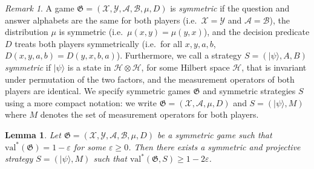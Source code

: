 \documentclass{book}
\theoremstyle{plain}
\newtheorem{lemma}[subsection]{Lemma}
\theoremstyle{definition}
\theoremstyle{remark}
\newtheorem{remark}[subsection]{Remark}
\numberwithin{equation}{subsection}
\newcommand{\cal}[1]{\mathcal{#1}}
\newcommand{\mH}{\mathcal{H}}
\newcommand{\eps}{\varepsilon}
\newcommand{\ket}[1]{|#1\rangle}
\newcommand{\game}{\mathfrak{G}}
\newcommand{\strategy}{{S}}
\newcommand{\val}{\ensuremath{\mathrm{val}}}
\begin{document}
\begin{remark}\label{rem:symmetric-games}
	A game $\game = (\cal{X}, \cal{Y}, \cal{A}, \cal{B}, \mu, D)$ is
  \emph{symmetric} if the question and answer alphabets are the same for both
  players (i.e.\
  $\cal{X} = \cal{Y}$ and $\cal{A} = \cal{B}$), the distribution $\mu$ is
  symmetric (i.e.\
  $\mu(x,y) = \mu(y,x)$), and the decision predicate $D$ treats both players
  symmetrically (i.e.\ for all $x,y,a,b$, $D(x,y,a,b) = D(y,x,b,a)$).
  Furthermore, we call a strategy $\strategy = (\ket{\psi}, A, B)$
  \emph{symmetric} if $\ket{\psi}$ is a state in $\mH \otimes \mH$, for some
  Hilbert space $\mH$, that is invariant under permutation of the two factors,
  and the measurement operators of both players are identical.
  We specify symmetric games $\game$ and symmetric strategies $\strategy$ using
  a more compact notation: we write $\game = (\cal{X}, \cal{A}, \mu, D)$ and
  $\strategy = (\ket{\psi}, M)$ where $M$ denotes the set of measurement
  operators for both players.
\end{remark}

\begin{lemma}\label{lem:symmetric-strat}
  Let $\game = (\cal{X}, \cal{Y}, \cal{A}, \cal{B}, \mu, D)$ be a symmetric game
  such that $\val^*(\game) = 1-\eps$ for some $\eps\geq 0$.
  Then there exists a symmetric and projective strategy
  $\strategy=(\ket{\psi},M)$ such that $\val^*(\game,\strategy)\geq 1-2\eps$.
\end{lemma}
\end{document}
